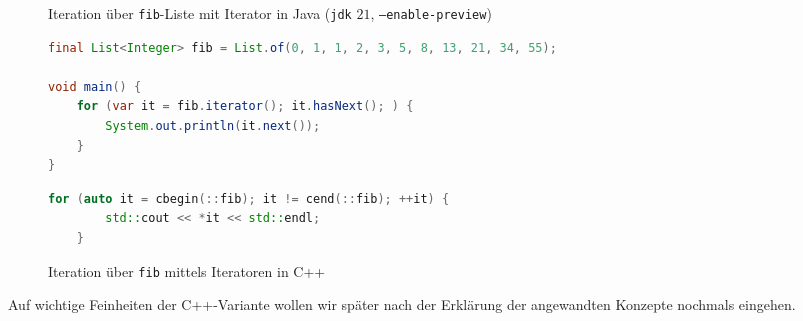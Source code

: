 \documentclass[runningheads]{llncs}
\begin{document}
\begin{figure}
	\caption{Iteration über \texttt{fib}-Liste mit Iterator in Java (\texttt{jdk} $21$, \texttt{--enable-preview})}
	\label{code:iterator-java}
	\begin{lstlisting}[language=Java]
final List<Integer> fib = List.of(0, 1, 1, 2, 3, 5, 8, 13, 21, 34, 55);

void main() {
    for (var it = fib.iterator(); it.hasNext(); ) {
        System.out.println(it.next());
    }
}\end{lstlisting}
	\caption{Iteration über \texttt{fib} mittels Iteratoren in C++}
	\label{code:iterator-cpp}
	\begin{lstlisting}[language=C++]
	for (auto it = cbegin(::fib); it != cend(::fib); ++it) {
		std::cout << *it << std::endl;
	}\end{lstlisting}
\end{figure}


\noindent Auf wichtige Feinheiten der C++-Variante wollen wir später nach der Erklärung der angewandten Konzepte nochmals eingehen.



\end{document}
